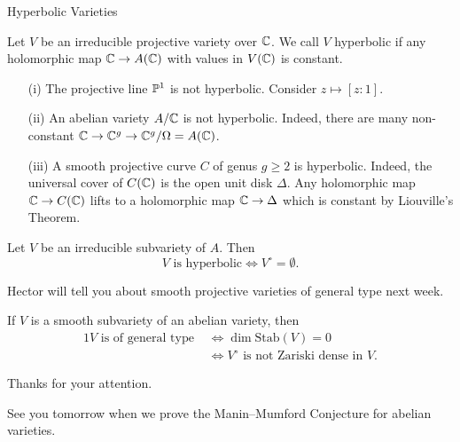 \documentclass{beamer}
\begin{document}
\begin{frame}{Hyperbolic Varieties}
  \begin{definition}
    Let $V$ be an irreducible projective variety over ${\mathbb{C}}$.
      We call $V$ \alert{hyperbolic} if
      any holomorphic map ${\mathbb{C}} \rightarrow A({\mathbb{C}})$ with values in
      $V({\mathbb{C}})$ is
      constant.
  \end{definition}

  \begin{example}
    \begin{enumerate}
    \item [(i)]    The projective line ${\mathbb{P}}^1$ is \alert{not} hyperbolic. Consider
    $z\mapsto [z:1]$.
    \item[(ii)] An abelian variety $A/{\mathbb{C}}$ is \alert{not} hyperbolic.
      Indeed, there are many non-constant
      ${\mathbb{C}}\rightarrow {\mathbb{C}}^g\rightarrow {\mathbb{C}}^g/\Omega =A({\mathbb{C}})$. 
    \item[(iii)] A smooth projective curve $C$ of genus $g\ge 2$ is
      hyperbolic. Indeed, the universal cover of $C({\mathbb{C}})$ is the open
      unit disk $\Delta$.
      Any holomorphic map ${\mathbb{C}}\rightarrow C({\mathbb{C}})$ lifts to a
      holomorphic map ${\mathbb{C}}\rightarrow\Delta$ which is constant by
      Liouville's Theorem.
    \end{enumerate}
  \end{example}
\end{frame}

\begin{frame}
  \begin{theorem} Let $V$ be an irreducible subvariety of $A$. 
    Then
    $$\text{$V$ is hyperbolic}\Longleftrightarrow
    V^{\circ}=\emptyset. $$
  \end{theorem}

  Hector will tell you about \alert{smooth projective varieties of
    general type} next week.

  If $V$ is a smooth subvariety of an abelian variety, then 
  \begin{alignat*}1
    V \text{ is of general type }&\Leftrightarrow\dim
    \mathrm{Stab}(V)=0 \\
    &\Leftrightarrow
    \text{$V^{\circ}$ is
      not Zariski dense in $V$.}
  \end{alignat*}
\end{frame}


\begin{frame}
  \begin{center}
    Thanks for your attention.

    See you tomorrow when we prove the Manin--Mumford Conjecture for
    abelian varieties. 
  \end{center}
\end{frame}
\end{document}
